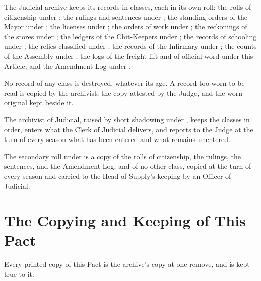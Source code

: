 \begin{clauses}
\item The Judicial archive keeps its records in classes, each in its own roll: the rolls of citizenship under ; the rulings and sentences under ; the standing orders of the Mayor under ; the licenses under ; the orders of work under ; the reckonings of the stores under ; the ledgers of the Chit-Keepers under ; the records of schooling under ; the relics classified under ; the records of the Infirmary under ; the counts of the Assembly under ; the logs of the freight lift and of official word under this Article; and the Amendment Log under .
\item No record of any class is destroyed, whatever its age. A record too worn to be read is copied by the archivist, the copy attested by the Judge, and the worn original kept beside it.
\item The archivist of Judicial, raised by short shadowing under , keeps the classes in order, enters what the Clerk of Judicial delivers, and reports to the Judge at the turn of every season what has been entered and what remains unentered.
\item The secondary roll under  is a copy of the rolls of citizenship, the rulings, the sentences, and the Amendment Log, and of no other class, copied at the turn of every season and carried to the Head of Supply's keeping by an Officer of Judicial.
\end{clauses}

\section{The Copying and Keeping of This Pact}
\label{sec:records:copying-and-keeping-of-this-pact}

Every printed copy of this Pact is the archive's copy at one remove, and is kept true to it.

